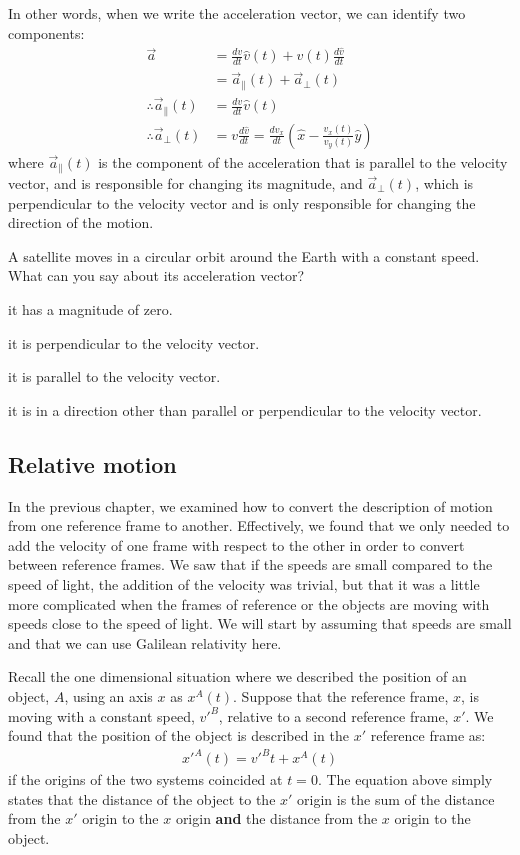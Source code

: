 In other words, when we write the acceleration vector, we can identify two components:
\begin{align*}
\vec a&=\frac{dv}{dt}\hat v(t)+v(t)\frac{d\hat v}{dt}\\
&=\vec a_{\parallel}(t) + \vec a_{\bot}(t)\\
\therefore \vec a_{\parallel}(t)&=\frac{dv}{dt}\hat v(t)\\
\therefore \vec a_{\bot}(t)&=v\frac{d\hat v}{dt}=\frac{dv_x}{dt} \left(\hat x - \frac{v_x(t)}{v_y(t)}\hat y\right)
\end{align*}
where $\vec a_{\parallel}(t)$ is the component of the acceleration that is parallel to the velocity vector, and is responsible for changing its magnitude, and $\vec a_{\bot}(t)$, which is perpendicular to the velocity vector and is only responsible for changing the direction of the motion.

\begin{checkpointMC}{A satellite moves in a circular orbit around the Earth with a constant speed. What can you say about its acceleration vector?}
\item it has a magnitude of zero.
\item it is perpendicular to the velocity vector.
\item it is parallel to the velocity vector.
\item it is in a direction other than parallel or perpendicular to the velocity vector.
\end{checkpointMC}

\subsection{Relative motion}
In the previous chapter, we examined how to convert the description of motion from one reference frame to another. Effectively, we found that we only needed to add the velocity of one frame with respect to the other in order to convert between reference frames. We saw that if the speeds are small compared to the speed of light, the addition of the velocity was trivial, but that it was a little more complicated when the frames of reference or the objects are moving with speeds close to the speed of light. We will start by assuming that speeds are small and that we can use Galilean relativity here. 

Recall the one dimensional situation where we described the position of an object, $A$, using an axis $x$ as $x^A(t)$. Suppose that the reference frame, $x$, is moving with a constant speed, $v'^B$, relative to a second reference frame, $x'$. We found that the position of the object is described in the $x'$ reference frame as:
\begin{align*}
x'^A(t)=v'^Bt+x^A(t)
\end{align*}
if the origins of the two systems coincided at $t=0$. The equation above simply states that the distance of the object to the $x'$ origin is the sum of the distance from the $x'$ origin to the $x$ origin \textbf{and} the distance from the $x$ origin to the object.

